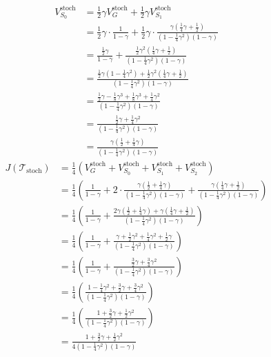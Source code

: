 \begin{align*}
    V^{\text{stoch}}_{S_0} &= \frac{1}{2}\gamma V^{\text{stoch}}_G + \frac{1}{2}\gamma V^{\text{stoch}}_{S_1} \\
    &= \frac{1}{2}\gamma \cdot \frac{1}{1-\gamma} + \frac{1}{2}\gamma \cdot \frac{\gamma(\frac{1}{4}\gamma + \frac{1}{2})}{(1 - \frac{1}{4}\gamma^2)(1-\gamma)} \\
    &= \frac{\frac{1}{2}\gamma}{1-\gamma} + \frac{\frac{1}{2}\gamma^2(\frac{1}{4}\gamma + \frac{1}{2})}{(1 - \frac{1}{4}\gamma^2)(1-\gamma)} \\
    &= \frac{\frac{1}{2}\gamma(1 - \frac{1}{4}\gamma^2) + \frac{1}{2}\gamma^2(\frac{1}{4}\gamma + \frac{1}{2})}{(1 - \frac{1}{4}\gamma^2)(1-\gamma)} \\
    &= \frac{\frac{1}{2}\gamma - \frac{1}{8}\gamma^3 + \frac{1}{8}\gamma^3 + \frac{1}{4}\gamma^2}{(1 - \frac{1}{4}\gamma^2)(1-\gamma)} \\
    &= \frac{\frac{1}{2}\gamma + \frac{1}{4}\gamma^2}{(1 - \frac{1}{4}\gamma^2)(1-\gamma)} \\
    &= \frac{\gamma(\frac{1}{2} + \frac{1}{4}\gamma)}{(1 - \frac{1}{4}\gamma^2)(1-\gamma)}
\end{align*}
\begin{align*}
    J(\mathcal{T}_{\text{stoch}}) &= \frac{1}{4}(V^{\text{stoch}}_G + V^{\text{stoch}}_{S_0} + V^{\text{stoch}}_{S_1} + V^{\text{stoch}}_{S_2}) \\
    &= \frac{1}{4}\left(\frac{1}{1-\gamma} + 2 \cdot \frac{\gamma(\frac{1}{2} + \frac{1}{4}\gamma)}{(1 - \frac{1}{4}\gamma^2)(1-\gamma)} + \frac{\gamma(\frac{1}{4}\gamma + \frac{1}{2})}{(1 - \frac{1}{4}\gamma^2)(1-\gamma)}\right) \\
    &= \frac{1}{4}\left(\frac{1}{1-\gamma} + \frac{2\gamma(\frac{1}{2} + \frac{1}{4}\gamma) + \gamma(\frac{1}{4}\gamma + \frac{1}{2})}{(1 - \frac{1}{4}\gamma^2)(1-\gamma)}\right) \\
    &= \frac{1}{4}\left(\frac{1}{1-\gamma} + \frac{\gamma + \frac{1}{2}\gamma^2 + \frac{1}{4}\gamma^2 + \frac{1}{2}\gamma}{(1 - \frac{1}{4}\gamma^2)(1-\gamma)}\right) \\
    &= \frac{1}{4}\left(\frac{1}{1-\gamma} + \frac{\frac{3}{2}\gamma + \frac{3}{4}\gamma^2}{(1 - \frac{1}{4}\gamma^2)(1-\gamma)}\right) \\
    &= \frac{1}{4}\left(\frac{1 - \frac{1}{4}\gamma^2 + \frac{3}{2}\gamma + \frac{3}{4}\gamma^2}{(1 - \frac{1}{4}\gamma^2)(1-\gamma)}\right) \\
    &= \frac{1}{4}\left(\frac{1 + \frac{3}{2}\gamma + \frac{1}{2}\gamma^2}{(1 - \frac{1}{4}\gamma^2)(1-\gamma)}\right) \\
    &= \frac{1 + \frac{3}{2}\gamma + \frac{1}{2}\gamma^2}{4(1 - \frac{1}{4}\gamma^2)(1-\gamma)}
\end{align*}

